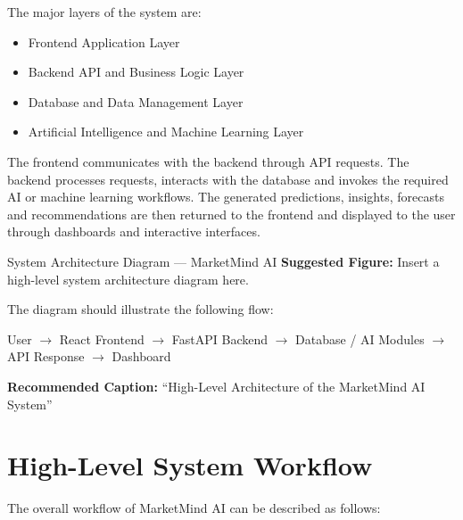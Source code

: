 \documentclass[12pt,a4paper]{report}
\begin{document}
The major layers of the system are:

\begin{itemize}[leftmargin=1.2cm]
    \item Frontend Application Layer
    \item Backend API and Business Logic Layer
    \item Database and Data Management Layer
    \item Artificial Intelligence and Machine Learning Layer
\end{itemize}

The frontend communicates with the backend through API requests.
The backend processes requests, interacts with the database and invokes
the required AI or machine learning workflows. The generated predictions,
insights, forecasts and recommendations are then returned to the frontend
and displayed to the user through dashboards and interactive interfaces.

\begin{screenshotplaceholder}{System Architecture Diagram --- MarketMind AI}
\textbf{Suggested Figure:} Insert a high-level system architecture diagram here.

\vspace{0.3cm}

The diagram should illustrate the following flow:

\begin{center}
User $\rightarrow$ React Frontend $\rightarrow$ FastAPI Backend
$\rightarrow$ Database / AI Modules
$\rightarrow$ API Response $\rightarrow$ Dashboard
\end{center}

\vspace{0.3cm}

\textbf{Recommended Caption:}
``High-Level Architecture of the MarketMind AI System''
\end{screenshotplaceholder}


\section{High-Level System Workflow}

The overall workflow of MarketMind AI can be described as follows:
\end{document}
